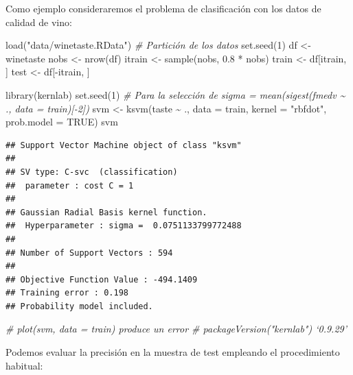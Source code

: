 \documentclass[
]{book}
\newenvironment{Shaded}{\begin{snugshade}}{\end{snugshade}}
\newcommand{\AttributeTok}[1]{\textcolor[rgb]{0.77,0.63,0.00}{#1}}
\newcommand{\CommentTok}[1]{\textcolor[rgb]{0.56,0.35,0.01}{\textit{#1}}}
\newcommand{\ConstantTok}[1]{\textcolor[rgb]{0.00,0.00,0.00}{#1}}
\newcommand{\DecValTok}[1]{\textcolor[rgb]{0.00,0.00,0.81}{#1}}
\newcommand{\FloatTok}[1]{\textcolor[rgb]{0.00,0.00,0.81}{#1}}
\newcommand{\FunctionTok}[1]{\textcolor[rgb]{0.00,0.00,0.00}{#1}}
\newcommand{\NormalTok}[1]{#1}
\newcommand{\OtherTok}[1]{\textcolor[rgb]{0.56,0.35,0.01}{#1}}
\newcommand{\SpecialCharTok}[1]{\textcolor[rgb]{0.00,0.00,0.00}{#1}}
\newcommand{\StringTok}[1]{\textcolor[rgb]{0.31,0.60,0.02}{#1}}
\theoremstyle{break}
\theoremstyle{definition}
\theoremstyle{definition}
\theoremstyle{definition}
\theoremstyle{definition}
\theoremstyle{remark}
\begin{document}
Como ejemplo consideraremos el problema de clasificación con los datos de calidad de vino:

\begin{Shaded}
\begin{Highlighting}[]
\FunctionTok{load}\NormalTok{(}\StringTok{"data/winetaste.RData"}\NormalTok{)}
\CommentTok{\# Partición de los datos}
\FunctionTok{set.seed}\NormalTok{(}\DecValTok{1}\NormalTok{)}
\NormalTok{df }\OtherTok{\textless{}{-}}\NormalTok{ winetaste}
\NormalTok{nobs }\OtherTok{\textless{}{-}} \FunctionTok{nrow}\NormalTok{(df)}
\NormalTok{itrain }\OtherTok{\textless{}{-}} \FunctionTok{sample}\NormalTok{(nobs, }\FloatTok{0.8} \SpecialCharTok{*}\NormalTok{ nobs)}
\NormalTok{train }\OtherTok{\textless{}{-}}\NormalTok{ df[itrain, ]}
\NormalTok{test }\OtherTok{\textless{}{-}}\NormalTok{ df[}\SpecialCharTok{{-}}\NormalTok{itrain, ]}


\FunctionTok{library}\NormalTok{(kernlab)}
\FunctionTok{set.seed}\NormalTok{(}\DecValTok{1}\NormalTok{) }\CommentTok{\# Para la selección de sigma = mean(sigest(fmedv \textasciitilde{} ., data = train)[{-}2])}
\NormalTok{svm }\OtherTok{\textless{}{-}} \FunctionTok{ksvm}\NormalTok{(taste }\SpecialCharTok{\textasciitilde{}}\NormalTok{ ., }\AttributeTok{data =}\NormalTok{ train,}
            \AttributeTok{kernel =} \StringTok{"rbfdot"}\NormalTok{, }\AttributeTok{prob.model =} \ConstantTok{TRUE}\NormalTok{)}
\NormalTok{svm}
\end{Highlighting}
\end{Shaded}

\begin{verbatim}
## Support Vector Machine object of class "ksvm" 
## 
## SV type: C-svc  (classification) 
##  parameter : cost C = 1 
## 
## Gaussian Radial Basis kernel function. 
##  Hyperparameter : sigma =  0.0751133799772488 
## 
## Number of Support Vectors : 594 
## 
## Objective Function Value : -494.1409 
## Training error : 0.198 
## Probability model included.
\end{verbatim}

\begin{Shaded}
\begin{Highlighting}[]
\CommentTok{\# plot(svm, data = train) produce un error \# packageVersion("kernlab") ‘0.9.29’}
\end{Highlighting}
\end{Shaded}

Podemos evaluar la precisión en la muestra de test empleando el procedimiento habitual:
\end{document}
